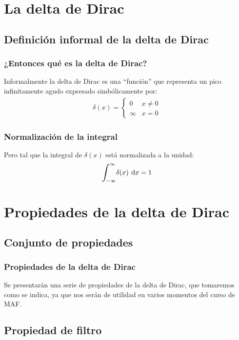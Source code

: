 \documentclass[12pt]{beamer}
\begin{document}
\section{La delta de Dirac}
\subsection{Definición informal de la delta de Dirac}

\begin{frame}
\frametitle{¿Entonces qué es la delta de Dirac?}
Informalmente la delta de Dirac es una \enquote{función} que representa un pico infinitamente agudo expresado simbólicamente por:
\pause
\begin{align}
\delta (x) = \begin{cases}
0 & x \neq 0 \\
\infty & x = 0
\end{cases}
\label{eq:ecuacion_delta_01}
\end{align}
\end{frame}
\begin{frame}
\frametitle{Normalización de la integral}
Pero tal que la integral de $\delta (x)$ está normalizada a la unidad:
\pause
\begin{equation}
\scaleint{6ex}_{\bs -\infty}^{\infty} \delta (x) \: \dd{x} = 1 
\label{eq:ecuacion_delta_02}
\end{equation}
\end{frame}

\section{Propiedades de la delta de Dirac}
\subsection{Conjunto de propiedades}

\begin{frame}
\frametitle{Propiedades de la delta de Dirac}
Se presentarán una serie de propiedades de la delta de Dirac, que tomaremos como se indica, ya que nos serán de utilidad en varios momentos del curso de MAF.
\end{frame}

\subsection{Propiedad de filtro}
\end{document}
